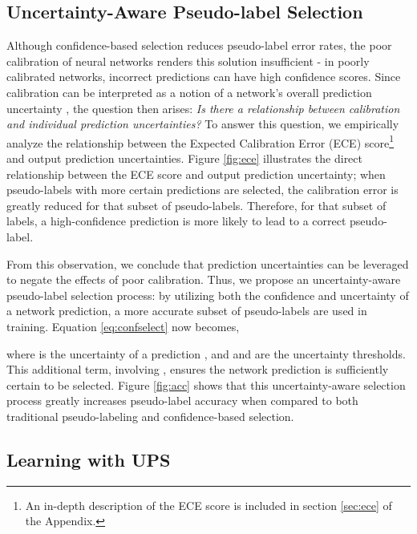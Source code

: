 \documentclass{article} \usepackage{iclr2021_conference,times}
\begin{document}
\subsection{Uncertainty-Aware Pseudo-label Selection}
Although confidence-based selection reduces pseudo-label error rates, the poor calibration of neural networks renders this solution insufficient - in poorly calibrated networks, incorrect predictions can have high confidence scores. Since calibration can be interpreted as a notion of a network's overall prediction uncertainty \citep{NIPS2017_7219}, the question then arises: \textit{Is there a relationship between calibration and individual prediction uncertainties?} To answer this question, we empirically analyze the relationship between the Expected Calibration Error (ECE) score\footnote{An in-depth description of the ECE score is included in section \ref{sec:ece} of the Appendix.} \citep{pmlr-v70-guo17a} and output prediction uncertainties.
Figure \ref{fig:ece} illustrates the direct relationship between the ECE score and output prediction uncertainty; when pseudo-labels with more certain predictions are selected, the calibration error is greatly reduced for that subset of pseudo-labels. Therefore, for that subset of labels, a high-confidence prediction is more likely to lead to a correct pseudo-label.

From this observation, we conclude that prediction uncertainties can be leveraged to negate the effects of poor calibration. Thus, we propose an uncertainty-aware pseudo-label selection process: by utilizing both the confidence and uncertainty of a network prediction, a more accurate subset of pseudo-labels are used in training. Equation \ref{eq:confselect} now becomes,



where  is the uncertainty of a prediction , and  and  are the uncertainty thresholds. This additional term, involving  , ensures the network prediction is sufficiently certain to be selected. Figure \ref{fig:acc} shows that this uncertainty-aware selection process greatly increases pseudo-label accuracy when compared to both traditional pseudo-labeling and confidence-based selection.


\subsection{Learning with UPS}
\end{document}
